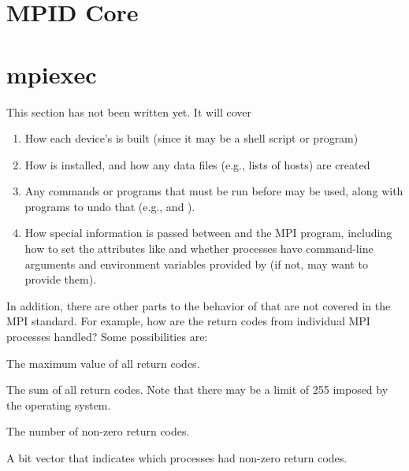 \documentclass{article}
\begin{document}


\section{MPID Core}

%

\section{mpiexec}
This section has not been written yet.  It will cover
\begin{enumerate}
\item How each device's  is built (since it may be a shell
  script or program)
\item How  is installed, and how any data files (e.g., lists of
  hosts) are created
\item Any commands or programs that must be run before  may be
  used, along with programs to undo that (e.g.,  and
  ). 
\item How special information is passed between  and the MPI
  program, including how to set the attributes like  and
  whether processes have command-line arguments and environment variables
  provided by  (if not,  may want to provide
  them). 
\end{enumerate}

In addition, there are other parts to the behavior of 
that are not covered in the MPI standard.  For example, how are the
return codes from individual MPI processes handled?  Some
possibilities are:
\begin{description}
\item The maximum value of all return codes.
\item The sum of all return codes.  Note that there may be
a limit of 255 imposed by the operating system.
\item The number of non-zero return codes.
\item A bit vector that indicates which processes had non-zero return
codes.
\end{description}
\end{document}
